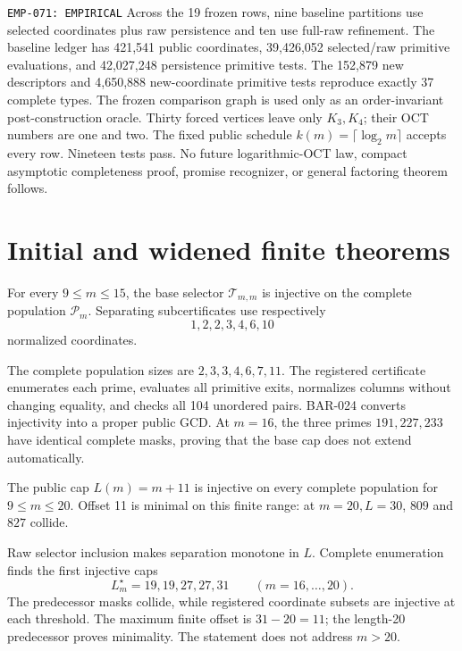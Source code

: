 \documentclass[11pt]{article}
\begin{document}
{\texttt{EMP-071: EMPIRICAL}}
Across the 19 frozen rows, nine baseline partitions use selected coordinates
plus raw persistence and ten use full-raw refinement.  The baseline ledger
has 421,541 public coordinates, 39,426,052 selected/raw primitive
evaluations, and 42,027,248 persistence primitive tests.  The 152,879 new
descriptors and 4,650,888 new-coordinate primitive tests reproduce exactly
37 complete types.  The frozen comparison graph is used only as an
order-invariant post-construction oracle.
Thirty forced vertices leave only \(K_3,K_4\); their OCT numbers are one and
two.  The fixed public schedule \(k(m)=\lceil\log_2m\rceil\) accepts every
row.  Nineteen tests pass.  No
future logarithmic-OCT law, compact asymptotic completeness proof, promise
recognizer, or general factoring theorem follows.

\section{Initial and widened finite theorems}

{}
For every \(9\le m\le15\), the base selector
\(\mathcal T_{m,m}\) is injective on the complete population
\(\mathcal P_m\).  Separating subcertificates use respectively
\[
 1,2,2,3,4,6,10
\]
normalized coordinates.

\begin{claimproof}
The complete population sizes are \(2,3,3,4,6,7,11\).  The registered
certificate enumerates each prime, evaluates all primitive exits, normalizes
columns without changing equality, and checks all 104 unordered pairs.
BAR-024 converts injectivity into a proper public GCD.  At \(m=16\), the
three primes \(191,227,233\) have identical complete masks, proving that the
base cap does not extend automatically.
\end{claimproof}

{}
The public cap \(L(m)=m+11\) is injective
on every complete population for \(9\le m\le20\).  Offset 11 is minimal on
this finite range: at \(m=20,L=30\), \(809\) and \(827\) collide.

\begin{claimproof}
Raw selector inclusion makes separation monotone in \(L\).  Complete
enumeration finds the first injective caps
\[
 L_m^\star=19,19,27,27,31\qquad(m=16,\ldots,20).
\]
The predecessor masks collide, while registered coordinate subsets are
injective at each threshold.  The maximum finite offset is
\(31-20=11\); the length-20 predecessor proves minimality.  The statement
does not address \(m>20\).
\end{claimproof}
\end{document}
